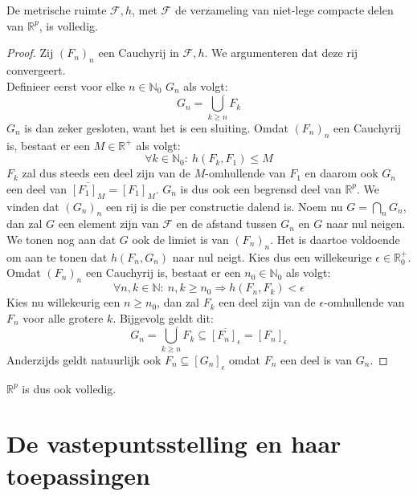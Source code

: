 \documentclass[main.tex]{subfiles}
\begin{document}
\begin{bpr}
  De metrische ruimte $\mathcal{F},h$, met $\mathcal{F}$ de verzameling van niet-lege compacte delen van $\mathbb{R}^{p}$, is volledig.

  \begin{proof}
    Zij $(F_{n})_{n}$ een Cauchyrij in $\mathcal{F},h$.
    We argumenteren dat deze rij convergeert.\\
    Definieer eerst voor elke $n\in\mathbb{N}_{0}$ $G_{n}$ als volgt:
    \[ G_{n} = \overline{\bigcup_{k \ge n}F_{k}} \]
    $G_{n}$ is dan zeker gesloten, want het is een sluiting.
    Omdat $(F_{n})_{n}$ een Cauchyrij is, bestaat er een $M\in\mathbb{R}^{+}$ als volgt:
    \[ \forall k\in \mathbb{N}_{0}:\ h(F_{k},F_{1}) \le M \]
    $F_{k}$ zal dus steeds een deel zijn van de $M$-omhullende van $F_{1}$ en daarom ook $G_{n}$ een deel van $\overline{[F_{1}]_{M}} = [F_{1}]_{M}$.
    $G_{n}$ is dus ook een begrensd deel van $\mathbb{R}^{p}$.
    We vinden dat $(G_{n})_{n}$ een rij is die per constructie dalend is.
    Noem nu $G = \bigcap_{n} G_{n}$, dan zal $G$ een element zijn van $\mathcal{F}$ en de afstand tussen $G_{n}$ en $G$ naar nul neigen.
    We tonen nog aan dat $G$ ook de limiet is van $(F_{n})_{n}$.
    Het is daartoe voldoende om aan te tonen dat $h(F_{n},G_{n})$ naar nul neigt.
    Kies dus een willekeurige $\epsilon \in \mathbb{R}_{0}^{+}$.
    Omdat $(F_{n})_{n}$ een Cauchyrij is, bestaat er een $n_{0}\in\mathbb{N}_{0}$ als volgt:
    \[ \forall n,k \in\mathbb{N}:\ n,k \ge n_{0}\Rightarrow h(F_{n},F_{k}) < \epsilon \]
    Kies nu willekeurig een $n\ge n_{0}$, dan zal $F_{k}$ een deel zijn van de $\epsilon$-omhullende van $F_{n}$ voor alle grotere $k$.
    Bijgevolg geldt dit:
    \[ G_{n} = \overline{\bigcup_{k \ge n}F_{k}} \subseteq \overline{[F_{n}]_{\epsilon}} = [F_{n}]_{\epsilon} \]
    Anderzijds geldt natuurlijk ook $F_{n} \subseteq [G_{n}]_{\epsilon}$ omdat $F_{n}$ een deel is van $G_{n}$.
  \end{proof}
\end{bpr}

\begin{gev}
  $\mathbb{R}^{p}$ is dus ook volledig.
\end{gev}


\section{De vastepuntsstelling en haar toepassingen}
\label{sec:vastepuntsstelling}
\end{document}
